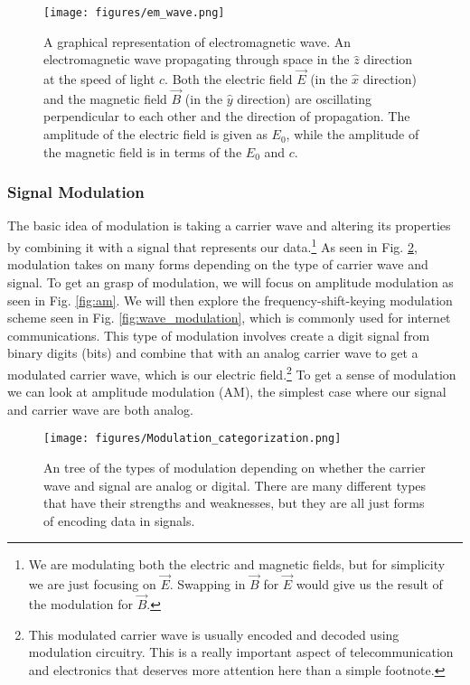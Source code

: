 \documentclass[10pt]{article}
\begin{document}
\begin{figure}[h!]
\centering
\texttt{[image: figures/em\_wave.png]}
\caption{A graphical representation of electromagnetic wave. An electromagnetic wave propagating through space in the $\hat{z}$ direction at the speed of light $c$. Both the electric field $\vec{E}$ (in the $\hat{x}$ direction) and the magnetic field $\vec{B}$ (in the $\hat{y}$ direction) are oscillating perpendicular to each other and the direction of propagation. The amplitude of the electric field is given as $E_0$, while the amplitude of the magnetic field is in terms of the $E_0$ and $c$\cite{griffiths_2019}.}
\label{fig:em_wave}
\end{figure}

\subsubsection{Signal Modulation}
\label{modulation}

The basic idea of modulation is taking a carrier wave and altering its properties by combining it with a signal that represents our data.\footnote{We are modulating both the electric and magnetic fields, but for simplicity we are just focusing on $\vec{E}$. Swapping in $\vec{B}$ for $\vec{E}$ would give us the result of the modulation for $\vec{B}$.} As seen in Fig. \ref{fig:modulation_types}, modulation takes on many forms depending on the type of carrier wave and signal. To get an grasp of modulation, we will focus on amplitude modulation as seen in Fig. \ref{fig:am}. We will then explore the frequency-shift-keying modulation scheme seen in Fig. \ref{fig:wave_modulation}, which is commonly used for internet communications. This type of modulation involves create a digit signal from binary digits (bits) and combine that with an analog carrier wave to get a modulated carrier wave, which is our electric field.\footnote{This modulated carrier wave is usually encoded and decoded using modulation circuitry. This is a really important aspect of telecommunication and electronics that deserves more attention here than a simple footnote\cite{schure1955amplitude}\cite{schure1955frequency}.} To get a sense of modulation we can look at amplitude modulation (AM), the simplest case where our signal and carrier wave are both analog. 

\begin{figure}[h!]
\centering
\texttt{[image: figures/Modulation\_categorization.png]}
\caption{An tree of the types of modulation depending on whether the carrier wave and signal are analog or digital. There are many different types that have their strengths and weaknesses, but they are all just forms of encoding data in signals\cite{mod_types}.}
\label{fig:modulation_types}
\end{figure}
\end{document}
